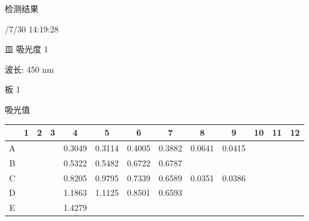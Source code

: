 \documentclass[UTF8,10pt,a4paper,fontset=fandol]{ctexart}
\renewcommand{\arraystretch}{1.15}
\newcommand{\fieldvalue}[1]{#1}
\begin{document}
\noindent
检测结果

/7/30 14:19:28

\noindent
皿 吸光度 1

\noindent
波长: 450 nm

\noindent
板 1

\noindent
吸光值

\begin{center}
\scriptsize
\renewcommand{\arraystretch}{1.55}
\begin{tabular}{c|c|c|c|c|c|c|c|c|c|c|c|c}
 &1&2&3&4&5&6&7&8&9&10&11&12\\ \hline
A&&&&
\fieldvalue{0.3049}&
\fieldvalue{0.3114}&
\fieldvalue{0.4005}&
\fieldvalue{0.3882}&
\fieldvalue{0.0641}&
\fieldvalue{0.0415}&\\ \hline
B&&&&
\fieldvalue{0.5322}&
\fieldvalue{0.5482}&
\fieldvalue{0.6722}&
\fieldvalue{0.6787}&&&\\ \hline
C&&&&
\fieldvalue{0.8205}&
\fieldvalue{0.9795}&
\fieldvalue{0.7339}&
\fieldvalue{0.6589}&
\fieldvalue{0.0351}&
\fieldvalue{0.0386}&\\ \hline
D&&&&
\fieldvalue{1.1863}&
\fieldvalue{1.1125}&
\fieldvalue{0.8501}&
\fieldvalue{0.6593}&&&\\ \hline
E&&&&
\fieldvalue{1.4279}&

\end{tabular}
\end{center}
\end{document}
